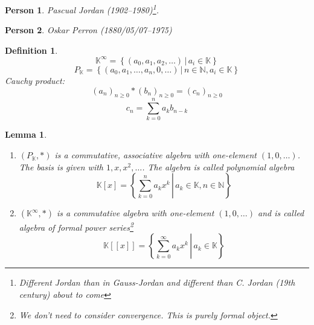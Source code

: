 \documentclass{article}
\newcounter{lecref}[section]
\numberwithin{lecref}{section}
\newtheorem{definition}[lecref]{Definition}
\newtheorem{lemma}[lecref]{Lemma}
\newtheorem*{person}{Person}
\newcommand{\setdef}[2]{\left\{\left.#1\,\right|\,#2\right\}}
\begin{document}
\begin{person}
  Pascual Jordan (1902--1980)\footnote{Different Jordan than in Gauss-Jordan and different than C. Jordan (19th century) about to come}.
\end{person}

\begin{person}
  Oskar Perron (1880/05/07--1975)
\end{person}

\begin{definition} %
  \[ \mathbb K^\infty = \setdef{(a_0, a_1, a_2, \dots)}{a_i \in \mathbb K} \]
  \[ P_{\mathbb K} = \setdef{(a_0, a_1, \dots, a_n, 0, \dots)}{n \in \mathbb N, a_i \in \mathbb K} \]
  Cauchy product:
  \[ (a_n)_{n \geq 0} * (b_n)_{n \geq 0} = (c_n)_{n \geq 0} \]
  \[ c_n = \sum_{k=0}^n a_k b_{n-k} \]
\end{definition}

\begin{lemma} %
  \label{lemma95}
  \begin{enumerate}
    \item $(P_{\mathbb K}, *)$ is a commutative, associative algebra with one-element $(1, 0, \dots)$.
      The basis is given with $1, x, x^2, \dots$. The algebra is called \emph{polynomial algebra}
      \[ \mathbb K[x] = \setdef{\sum_{k=0}^n a_k x^k}{a_k \in \mathbb K, n \in \mathbb N} \]
    \item $(\mathbb K^\infty, *)$ is a commutative algebra with one-element $(1, 0, \dots)$
      and is called \emph{algebra of formal power series}\footnote{We don't need to consider convergence. This is purely formal object.}
      \[ \mathbb K[[x]] = \setdef{\sum_{k=0}^\infty a_k x^k}{a_k \in \mathbb K} \]
  \end{enumerate}
\end{lemma}
\end{document}
